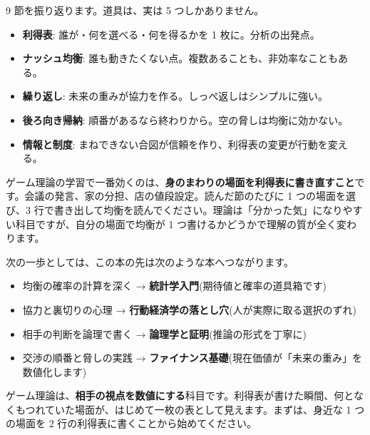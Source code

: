 \documentclass{article}
\begin{document}
9 節を振り返ります。道具は、実は 5 つしかありません。

\begin{itemize}
\item \textbf{利得表}: 誰が・何を選べる・何を得るかを 1 枚に。分析の出発点。
\item \textbf{ナッシュ均衡}: 誰も動きたくない点。複数あることも、非効率なこともある。
\item \textbf{繰り返し}: 未来の重みが協力を作る。しっぺ返しはシンプルに強い。
\item \textbf{後ろ向き帰納}: 順番があるなら終わりから。空の脅しは均衡に効かない。
\item \textbf{情報と制度}: まねできない合図が信頼を作り、利得表の変更が行動を変える。
\end{itemize}

ゲーム理論の学習で一番効くのは、\textbf{身のまわりの場面を利得表に書き直すこと}です。会議の発言、家の分担、店の値段設定。読んだ節のたびに 1 つの場面を選び、3 行で書き出して均衡を読んでください。理論は「分かった気」になりやすい科目ですが、自分の場面で均衡が 1 つ書けるかどうかで理解の質が全く変わります。

次の一歩としては、この本の先は次のような本へつながります。

\begin{itemize}
\item 均衡の確率の計算を深く → \textbf{統計学入門}(期待値と確率の道具箱です)
\item 協力と裏切りの心理 → \textbf{行動経済学の落とし穴}(人が実際に取る選択のずれ)
\item 相手の判断を論理で書く → \textbf{論理学と証明}(推論の形式を丁寧に)
\item 交渉の順番と脅しの実践 → \textbf{ファイナンス基礎}(現在価値が「未来の重み」を数値化します)
\end{itemize}

ゲーム理論は、\textbf{相手の視点を数値にする}科目です。利得表が書けた瞬間、何となくもつれていた場面が、はじめて一枚の表として見えます。まずは、身近な 1 つの場面を 2 行の利得表に書くことから始めてください。
\end{document}
